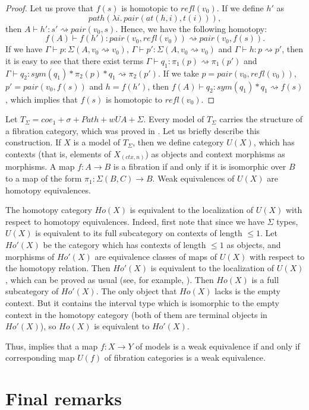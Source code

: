 \documentclass{mscs}
\newcommand{\idtype}{\rightsquigarrow}
\numberwithin{figure}{section}
\begin{document}
\begin{proof}
Let us prove that $f(s)$ is homotopic to $refl(v_0)$.
If we define $h'$ as
\[ path(\lambda i.\,pair(at(h,i), t(i))), \]
then $A \vdash h' : s' \idtype pair(v_0,s)$.
Hence, we have the following homotopy:
\[ f(A) \vdash f(h') : pair(v_0, refl(v_0)) \idtype pair(v_0, f(s)). \]
If we have $\Gamma \vdash p : \Sigma(A, v_0 \idtype v_0)$, $\Gamma \vdash p' : \Sigma(A, v_0 \idtype v_0)$ and $\Gamma \vdash h : p \idtype p'$,
then it is easy to see that there exist terms $\Gamma \vdash q_1 : \pi_1(p) \idtype \pi_1(p')$ and $\Gamma \vdash q_2 : sym(q_1) * \pi_2(p) * q_1 \idtype \pi_2(p')$.
If we take $p = pair(v_0, refl(v_0))$, $p' = pair(v_0, f(s))$ and $h = f(h')$, then $f(A) \vdash q_2 : sym(q_1) * q_1 \idtype f(s)$,
which implies that $f(s)$ is homotopic to $refl(v_0)$.
\end{proof}

Let $T_\Sigma = coe_1 + \sigma + Path + wUA + \Sigma$.
Every model of $T_\Sigma$ carries the structure of a fibration category, which was proved in \cite{tt-fibr-cat}.
Let us briefly describe this construction.
If $X$ is a model of $T_\Sigma$, then we define category $U(X)$, which has contexts (that is, elements of $X_{(ctx,n)}$) as objects and context morphisms as morphisms.
A map $f : A \to B$ is a fibration if and only if it is isomorphic over $B$ to a map of the form $\pi_1 : \Sigma(B,C) \to B$.
Weak equivalences of $U(X)$ are homotopy equivalences.

The homotopy category $Ho(X)$ is equivalent to the localization of $U(X)$ with respect to homotopy equivalences.
Indeed, first note that since we have $\Sigma$ types, $U(X)$ is equivalent to its full subcategory on contexts of length $\leq 1$.
Let $Ho'(X)$ be the category which has contexts of length $\leq 1$ as objects,
and morphisms of $Ho'(X)$ are equivalence classes of maps of $U(X)$ with respect to the homotopy relation.
Then $Ho'(X)$ is equivalent to the localization of $U(X)$, which can be proved as usual (see, for example, \cite[Corollary~1.2.9]{hovey}).
Then $Ho(X)$ is a full subcategory of $Ho'(X)$.
The only object that $Ho(X)$ lacks is the empty context.
But it contains the interval type which is isomorphic to the empty context in the homotopy category
(both of them are terminal objects in $Ho'(X)$), so $Ho(X)$ is equivalent to $Ho'(X)$.

Thus,  implies that a map $f : X \to Y$ of models is a weak equivalence if and only if
corresponding map $U(f)$ of fibration categories is a weak equivalence.

\section{Final remarks}
\end{document}
